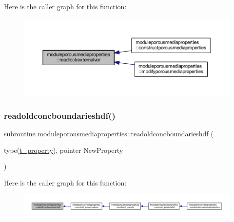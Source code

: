 Here is the caller graph for this function\+:\nopagebreak
\begin{figure}[H]
\begin{center}
\leavevmode
\includegraphics[width=350pt]{namespacemoduleporousmediaproperties_a56260cc89bfdab790c373015aa5f4675_icgraph}
\end{center}
\end{figure}
\mbox{\label{namespacemoduleporousmediaproperties_abf58df3d1437a63cdfba7d236b8d0fa9}} 
\subsubsection{\texorpdfstring{readoldconcboundarieshdf()}{readoldconcboundarieshdf()}}
{\footnotesize\ttfamily subroutine moduleporousmediaproperties\+::readoldconcboundarieshdf (\begin{DoxyParamCaption}\item[{type(\mbox{\hyperlink{structmoduleporousmediaproperties_1_1t__property}{t\+\_\+property}}), pointer}]{New\+Property }\end{DoxyParamCaption})\hspace{0.3cm}{\ttfamily [private]}}

Here is the caller graph for this function\+:\nopagebreak
\begin{figure}[H]
\begin{center}
\leavevmode
\includegraphics[width=350pt]{namespacemoduleporousmediaproperties_abf58df3d1437a63cdfba7d236b8d0fa9_icgraph}
\end{center}
\end{figure}
\mbox{\label{namespacemoduleporousmediaproperties_aa21cfad85460a30a39a9fb8f3421f874}} 
